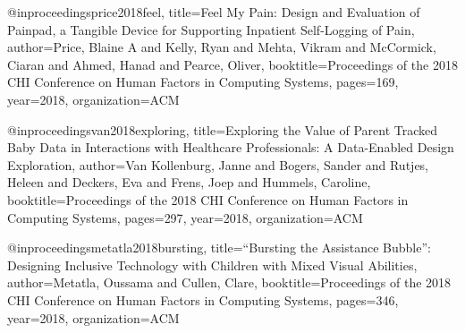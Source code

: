 @inproceedings{price2018feel,
  title={Feel My Pain: Design and Evaluation of Painpad, a Tangible Device for Supporting Inpatient Self-Logging of Pain},
  author={Price, Blaine A and Kelly, Ryan and Mehta, Vikram and McCormick, Ciaran and Ahmed, Hanad and Pearce, Oliver},
  booktitle={Proceedings of the 2018 CHI Conference on Human Factors in Computing Systems},
  pages={169},
  year={2018},
  organization={ACM}
}

@inproceedings{van2018exploring,
  title={Exploring the Value of Parent Tracked Baby Data in Interactions with Healthcare Professionals: A Data-Enabled Design Exploration},
  author={Van Kollenburg, Janne and Bogers, Sander and Rutjes, Heleen and Deckers, Eva and Frens, Joep and Hummels, Caroline},
  booktitle={Proceedings of the 2018 CHI Conference on Human Factors in Computing Systems},
  pages={297},
  year={2018},
  organization={ACM}
}

@inproceedings{metatla2018bursting,
  title={“Bursting the Assistance Bubble”: Designing Inclusive Technology with Children with Mixed Visual Abilities},
  author={Metatla, Oussama and Cullen, Clare},
  booktitle={Proceedings of the 2018 CHI Conference on Human Factors in Computing Systems},
  pages={346},
  year={2018},
  organization={ACM}
}